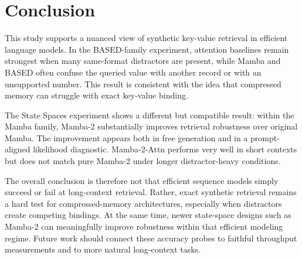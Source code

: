 \documentclass[10pt]{article}
\begin{document}
\section{Conclusion}

This study supports a nuanced view of synthetic key-value retrieval in
efficient language models. In the BASED-family experiment, attention baselines
remain strongest when many same-format distractors are present, while Mamba and
BASED often confuse the queried value with another record or with an
unsupported number. This result is consistent with the idea that compressed
memory can struggle with exact key-value binding.

The State Spaces experiment shows a different but compatible result: within
the Mamba family, Mamba-2 substantially improves retrieval robustness over
original Mamba. The improvement appears both in free generation and in a
prompt-aligned likelihood diagnostic. Mamba-2-Attn performs very well in short
contexts but does not match pure Mamba-2 under longer distractor-heavy
conditions.

The overall conclusion is therefore not that efficient sequence models simply
succeed or fail at long-context retrieval. Rather, exact synthetic retrieval
remains a hard test for compressed-memory architectures, especially when
distractors create competing bindings. At the same time, newer state-space
designs such as Mamba-2 can meaningfully improve robustness within that
efficient modeling regime. Future work should connect these accuracy probes to
faithful throughput measurements and to more natural long-context tasks.
\end{document}
